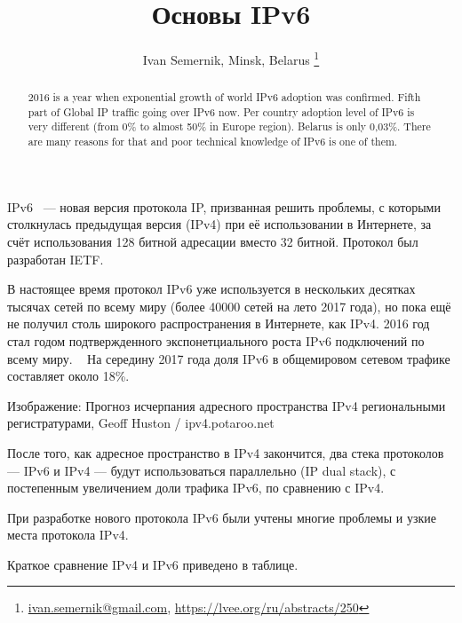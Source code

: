 \documentclass[10pt, a5paper]{article}
\begin{document}
\title{Основы IPv6}
\author{Ivan Semernik, Minsk, Belarus \footnote{\url{ivan.semernik@gmail.com}, \url {https://lvee.org/ru/abstracts/250}}}
\maketitle
\begin{abstract}
2016 is a year when exponential growth of world IPv6 adoption was confirmed. Fifth part of Global IP traffic going over IPv6 now. Per country adoption level of IPv6 is very different (from 0\% to almost 50\% in Europe region). Belarus is only 0,03\%. There are many reasons for that and poor technical knowledge of IPv6 is one of them.
\end{abstract}
IPv6 ~--- новая версия протокола IP, призванная решить проблемы, с которыми столкнулась предыдущая версия (IPv4) при её использовании в Интернете, за счёт использования 128 битной адресации вместо 32 битной. Протокол был разработан IETF. ~\cite{Semernik-0}

В настоящее время протокол IPv6 уже используется в нескольких десятках тысячах сетей по всему миру (более 40000 сетей на лето 2017 года), но пока ещё не получил столь широкого распространения в Интернете, как IPv4. 2016 год стал годом подтвержденного экспонетциального роста IPv6 подключений по всему миру. ~\cite{Semernik-1} На середину 2017 года доля IPv6 в общемировом сетевом трафике составляет около 18\%. ~\cite{Semernik-2}

Изображение: Прогноз исчерпания адресного пространства IPv4 региональными регистратурами, Geoff Huston / ipv4.potaroo.net



После того, как адресное пространство в IPv4 закончится, два стека протоколов — IPv6 и IPv4 — будут использоваться параллельно (IP dual stack), с постепенным увеличением доли трафика IPv6, по сравнению с IPv4.

При разработке нового протокола IPv6 были учтены многие проблемы и узкие места протокола IPv4.

Краткое сравнение IPv4  и IPv6 приведено в таблице.
\end{document}
